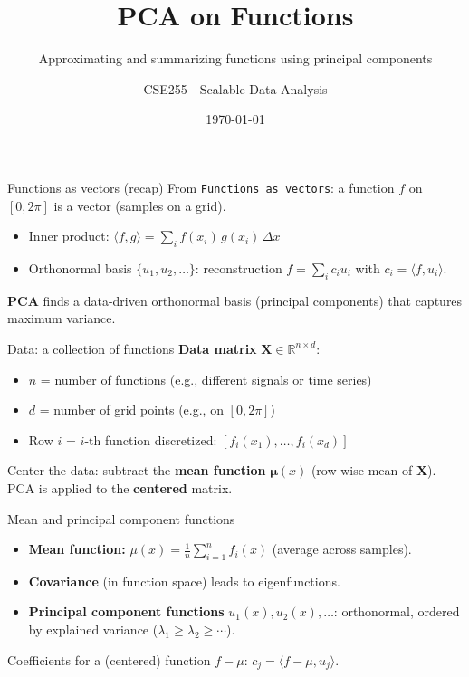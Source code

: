 \documentclass[aspectratio=169]{beamer}
\title{PCA on Functions}
\subtitle{Approximating and summarizing functions using principal components}
\author{CSE255 - Scalable Data Analysis}
\date{\today}
\begin{document}
\begin{frame}
  \titlepage
\end{frame}

\begin{frame}{Functions as vectors (recap)}
  \small
  From \texttt{Functions\_as\_vectors}: a function $f$ on $[0, 2\pi]$ is a vector (samples on a grid).
  \begin{itemize}
    \item Inner product: $\langle f, g \rangle = \sum_i f(x_i)\, g(x_i)\, \Delta x$
    \item Orthonormal basis $\{u_1, u_2, \ldots\}$: reconstruction $f = \sum_i c_i u_i$ with $c_i = \langle f, u_i \rangle$.
  \end{itemize}
  \vspace{0.2cm}
  \textbf{PCA} finds a data-driven orthonormal basis (principal components) that captures maximum variance.
\end{frame}

\begin{frame}{Data: a collection of functions}
  \small
  \textbf{Data matrix} $\mathbf{X} \in \mathbb{R}^{n \times d}$:
  \begin{itemize}
    \item $n$ = number of functions (e.g., different signals or time series)
    \item $d$ = number of grid points (e.g., on $[0, 2\pi]$)
    \item Row $i$ = $i$-th function discretized: $[f_i(x_1), \ldots, f_i(x_d)]$
  \end{itemize}
  \vspace{0.2cm}
  Center the data: subtract the \textbf{mean function} $\boldsymbol{\mu}(x)$ (row-wise mean of $\mathbf{X}$).\\
  PCA is applied to the \textbf{centered} matrix.
\end{frame}

\begin{frame}{Mean and principal component functions}
  \small
  \begin{itemize}
    \item \textbf{Mean function:} $\mu(x) = \frac{1}{n}\sum_{i=1}^n f_i(x)$ (average across samples).
    \item \textbf{Covariance} (in function space) leads to eigenfunctions.
    \item \textbf{Principal component functions} $u_1(x), u_2(x), \ldots$: orthonormal, ordered by explained variance ($\lambda_1 \geq \lambda_2 \geq \cdots$).
  \end{itemize}
  \vspace{0.2cm}
  Coefficients for a (centered) function $f - \mu$: $c_j = \langle f - \mu, u_j \rangle$.
\end{frame}
\end{document}
